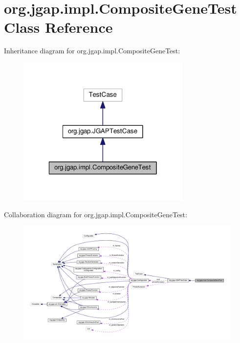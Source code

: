 \hypertarget{classorg_1_1jgap_1_1impl_1_1_composite_gene_test}{\section{org.\-jgap.\-impl.\-Composite\-Gene\-Test Class Reference}
\label{classorg_1_1jgap_1_1impl_1_1_composite_gene_test}
}


Inheritance diagram for org.\-jgap.\-impl.\-Composite\-Gene\-Test\-:
\nopagebreak
\begin{figure}[H]
\begin{center}
\leavevmode
\includegraphics[width=244pt]{classorg_1_1jgap_1_1impl_1_1_composite_gene_test__inherit__graph}
\end{center}
\end{figure}


Collaboration diagram for org.\-jgap.\-impl.\-Composite\-Gene\-Test\-:
\nopagebreak
\begin{figure}[H]
\begin{center}
\leavevmode
\includegraphics[width=350pt]{classorg_1_1jgap_1_1impl_1_1_composite_gene_test__coll__graph}
\end{center}
\end{figure}
